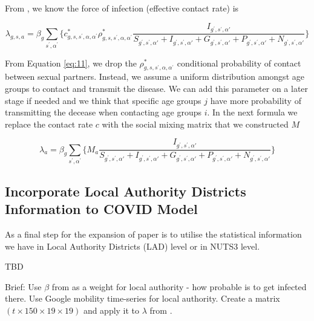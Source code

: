 \documentclass[12pt]{article}
\begin{document}
From \cite[p.9]{Gareth:2013}, we know the force of infection (effective contact rate) is

\begin{equation}
\lambda_{g,s,a}=\beta_{g}\sum_{s^{'}, \alpha^{'}} \bigg\{ c^{*}_{g,s,s^{'},\alpha,\alpha^{'}} \rho^{*}_{g,s,s^{'},\alpha,\alpha^{'}} \frac{I_{g^{'}, s^{'}, \alpha{'}}}{S_{g^{'}, s^{'}, \alpha{'}} + I_{g^{'}, s^{'}, \alpha{'}} + G_{g^{'}, s^{'}, \alpha{'}} + P_{g^{'}, s^{'}, \alpha{'}} + N_{g^{'}, s^{'}, \alpha{'}} } \bigg\}
\label{eq:11}
\end{equation}

From Equation \ref{eq:11}, we drop the $\rho^{*}_{g,s,s^{'},\alpha,\alpha^{'}}$ conditional probability of contact between sexual partners. Instead, we assume a uniform distribution amongst age groups to contact and transmit the disease. We can add this parameter on a later stage if needed and we think that specific age groups $j$ have more probability of transmitting the decease when contacting age groups $i$. In the next formula we replace the contact rate $c$ with the social mixing matrix that we constructed $M$

\begin{equation}
\lambda_{a}=\beta_{g}\sum_{s^{'}, \alpha^{'}} \bigg\{ M_{a} \frac{I_{g^{'}, s^{'}, \alpha{'}}}{S_{g^{'}, s^{'}, \alpha{'}} + I_{g^{'}, s^{'}, \alpha{'}} + G_{g^{'}, s^{'}, \alpha{'}} + P_{g^{'}, s^{'}, \alpha{'}} + N_{g^{'}, s^{'}, \alpha{'}} } \bigg\}
\label{eq:11}
\end{equation}

\subsection{Incorporate Local Authority Districts Information to COVID Model}
\label{sub:2.5}

As a final step for the expansion of \cite{Gareth:2013} paper is to utilise the statistical information we have in Local Authority Districts (LAD) level or in NUTS3 level. 

TBD

Brief: Use $\beta$ from \cite{Gareth:2013} as a weight for local authority - how probable is to get infected there. Use Google mobility time-series for local authority. Create a matrix $(t \times 150 \times 19 \times 19)$ and apply it to $\lambda$ from \cite{Gareth:2013}.



\end{document}
